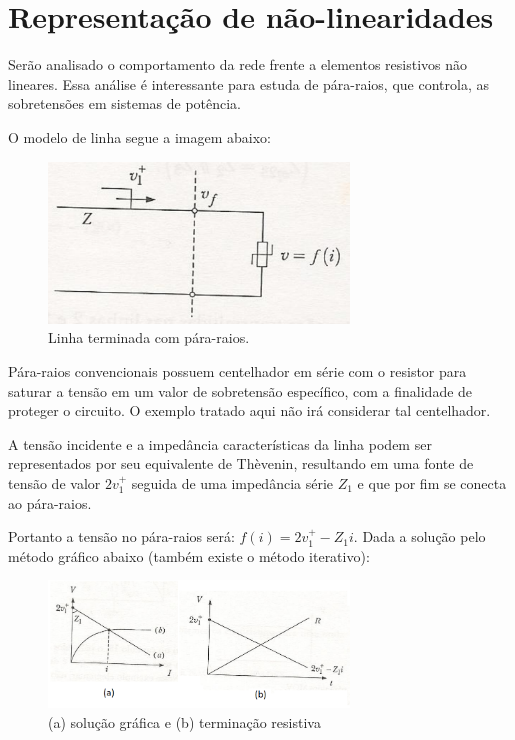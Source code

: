 \section{Representação de não-linearidades}

Serão analisado o comportamento da rede frente a elementos resistivos não lineares. Essa análise é interessante para estuda de pára-raios, que controla, as sobretensões em sistemas de potência.

O modelo de linha segue a imagem abaixo:

\begin{figure}[H]
\begin{center}
\includegraphics[width=8cm]{images/nlin.png}
\caption{Linha terminada com pára-raios.}
\label{slide7:nlin} 
\end{center}
\end{figure}

Pára-raios convencionais possuem centelhador em série com o resistor para saturar a tensão em um valor de sobretensão específico, com a finalidade de proteger o circuito. O exemplo tratado aqui não irá considerar tal centelhador.

A tensão incidente e a impedância características da linha podem ser representados por seu equivalente de Thèvenin, resultando em uma fonte de tensão de valor $2v_1^{+}$ seguida de uma impedância série $Z_1$ e que por fim se conecta ao pára-raios.

Portanto a tensão no pára-raios será: $f(i) = 2v_1^{+}-Z_1 i$. Dada a solução pelo método gráfico abaixo (também existe o método iterativo):

\begin{figure}[H]
\begin{center}
\includegraphics[width=8cm]{images/nlin2.png}
\caption{(a) solução gráfica e (b) terminação resistiva}
\label{slide7:nlin} 
\end{center}
\end{figure}

